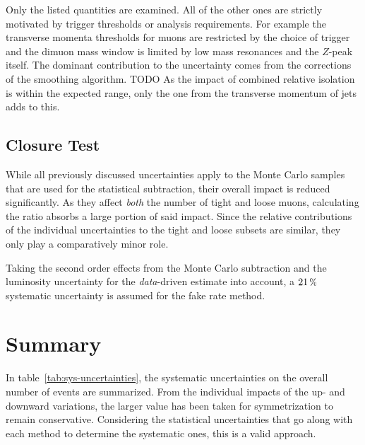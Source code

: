 Only the listed quantities are examined. All of the other ones are strictly motivated by trigger thresholds or analysis requirements. For example the transverse momenta thresholds for muons are restricted by the choice of trigger and the dimuon mass window is limited by low mass resonances and the $Z$-peak itself. The dominant contribution to the uncertainty comes from the corrections of the smoothing algorithm. {\huge TODO} As the impact of combined relative isolation is within the expected range, only the one from the transverse momentum of jets adds to this.

\subsection{Closure Test}
\label{sec:closure-test}



While all previously discussed uncertainties apply to the Monte Carlo samples that are used for the statistical subtraction, their overall impact is reduced significantly. As they affect \textit{both} the number of tight and loose muons, calculating the ratio absorbs a large portion of said impact. Since the relative contributions of the individual uncertainties to the tight and loose subsets are similar, they only play a comparatively minor role.

Taking the second order effects from the Monte Carlo subtraction and the luminosity uncertainty for the \textit{data}-driven estimate into account, a $21\,\pct$ systematic uncertainty is assumed for the fake rate method.


\section{Summary}
\label{sec:summary}

In table~\ref{tab:sys-uncertainties}, the systematic uncertainties on the overall number of events are summarized. From the individual impacts of the up- and downward variations, the larger value has been taken for symmetrization to remain conservative. Considering the statistical uncertainties that go along with each method to determine the systematic ones, this is a valid approach.

